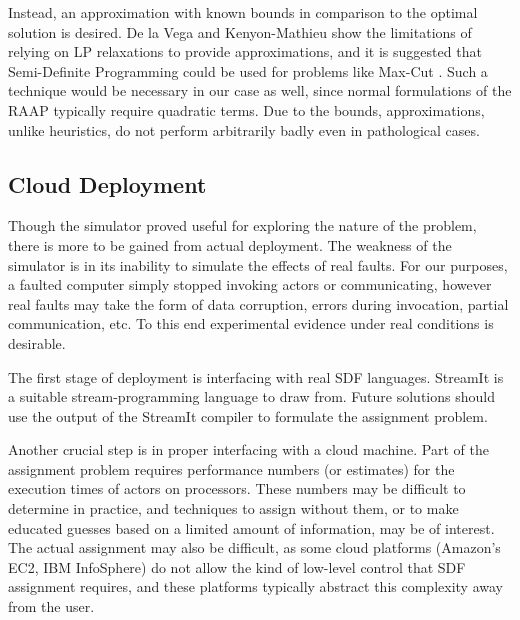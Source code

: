 Instead, an approximation with known bounds in comparison to the optimal solution is desired.
De la Vega and Kenyon-Mathieu show the limitations of relying on LP relaxations to provide approximations, and it is suggested that Semi-Definite Programming could be used for problems like Max-Cut \cite{fer07}.
Such a technique would be necessary in our case as well, since normal formulations of the RAAP typically require quadratic terms.
Due to the bounds, approximations, unlike heuristics, do not perform arbitrarily badly even in pathological cases.

\subsection{Cloud Deployment}

Though the simulator proved useful for exploring the nature of the problem, there is more to be gained from actual deployment.
The weakness of the simulator is in its inability to simulate the effects of real faults.
For our purposes, a faulted computer simply stopped invoking actors or communicating, however real faults may take the form of data corruption, errors during invocation, partial communication, etc.
To this end experimental evidence under real conditions is desirable.

The first stage of deployment is interfacing with real SDF languages.
StreamIt \cite{thies01, thies02, thies10, mal08} is a suitable stream-programming language to draw from.
Future solutions should use the output of the StreamIt compiler to formulate the assignment problem.

Another crucial step is in proper interfacing with a cloud machine.
Part of the assignment problem requires performance numbers (or estimates) for the execution times of actors on processors.
These numbers may be difficult to determine in practice, and techniques to assign without them, or to make educated guesses based on a limited amount of information, may be of interest.
The actual assignment may also be difficult, as some cloud platforms (Amazon's EC2, IBM InfoSphere) do not allow the kind of low-level control that SDF assignment requires, and these platforms typically abstract this complexity away from the user.
